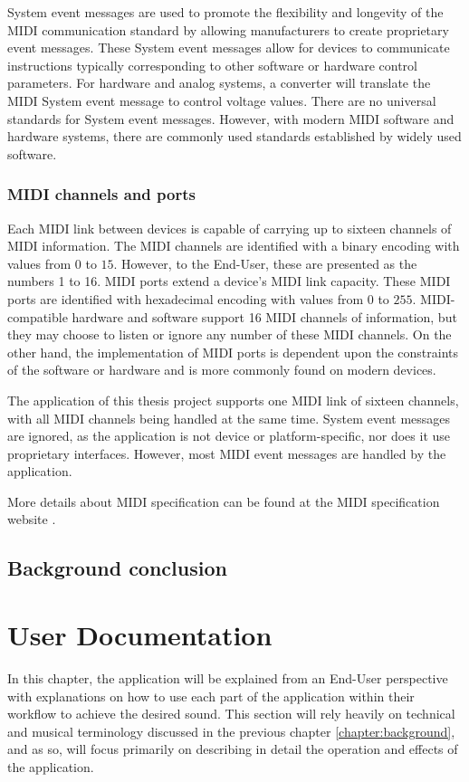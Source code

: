 \documentclass[a4paper,12pt]{report}
\begin{document}
System event messages are used to promote the flexibility and longevity of the MIDI communication standard by allowing manufacturers to create proprietary event messages. These System event messages allow for devices to communicate instructions typically corresponding to other software or hardware control parameters. For hardware and analog systems, a converter will translate the MIDI System event message to control voltage values. There are no universal standards for System event messages. However, with modern MIDI software and hardware systems, there are commonly used standards established by widely used software.

\subsection{MIDI channels and ports}
\label{subsec:midichannelports}
Each MIDI link between devices is capable of carrying up to sixteen channels of MIDI information. The MIDI channels are identified with a binary encoding with values from $0$ to $15$. However, to the End-User, these are presented as the numbers 1 to 16. MIDI ports extend a device's MIDI link capacity. These MIDI ports are identified with hexadecimal encoding with values from $0$ to $255$. MIDI-compatible hardware and software support 16 MIDI channels of information, but they may choose to listen or ignore any number of these MIDI channels. On the other hand, the implementation of MIDI ports is dependent upon the constraints of the software or hardware and is more commonly found on modern devices.

The application of this thesis project supports one MIDI link of sixteen channels, with all MIDI channels being handled at the same time. System event messages are ignored, as the application is not device or platform-specific, nor does it use proprietary interfaces. However, most MIDI event messages are handled by the application.

More details about MIDI specification can be found at the MIDI specification website \cite{midispec}.

\section{Background conclusion}


\chapter{User Documentation}
\label{chapter:userdoc}
In this chapter, the application will be explained from an End-User perspective with explanations on how to use each part of the application within their workflow to achieve the desired sound. This section will rely heavily on technical and musical terminology discussed in the previous chapter \ref{chapter:background}, and as so, will focus primarily on describing in detail the operation and effects of the application.
\end{document}
